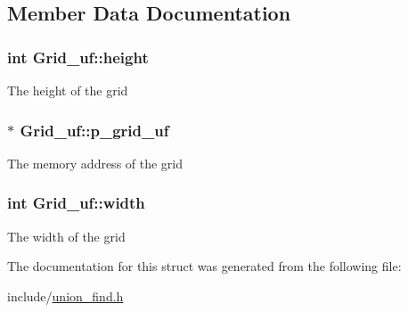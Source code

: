 \subsection{Member Data Documentation}
\hypertarget{structGrid__uf_a62c33989b80447749f70f1b6e659da59}{
\subsubsection[{height}]{\setlength{\rightskip}{0pt plus 5cm}int Grid\-\_\-uf\-::height}}\label{structGrid__uf_a62c33989b80447749f70f1b6e659da59}
The height of the grid \hypertarget{structGrid__uf_ab282730f76d88757830a713eef053a4c}{
\subsubsection[{p\-\_\-grid\-\_\-uf}]{$\ast$ Grid\-\_\-uf\-::p\-\_\-grid\-\_\-uf}}\label{structGrid__uf_ab282730f76d88757830a713eef053a4c}
The memory address of the grid \hypertarget{structGrid__uf_a8e67d779eff88c8263ceb63a73599671}{
\subsubsection[{width}]{\setlength{\rightskip}{0pt plus 5cm}int Grid\-\_\-uf\-::width}}\label{structGrid__uf_a8e67d779eff88c8263ceb63a73599671}
The width of the grid 

The documentation for this struct was generated from the following file\-:\begin{DoxyCompactItemize}
\item 
include/\hyperlink{union__find_8h}{union\-\_\-find.\-h}\end{DoxyCompactItemize}

